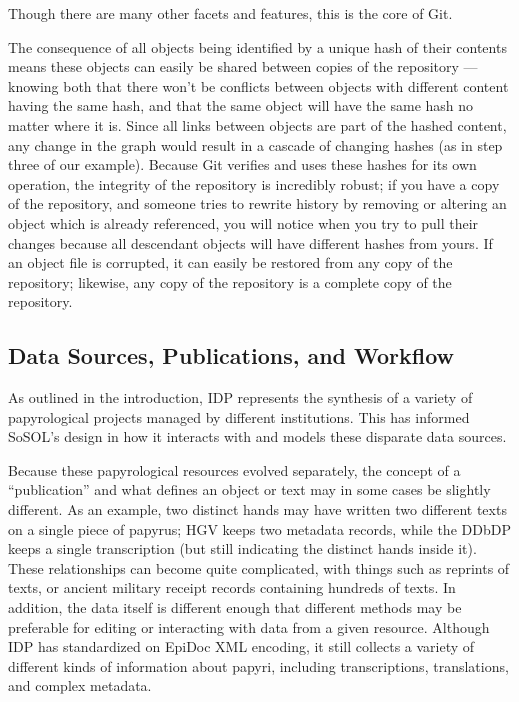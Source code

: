 \documentclass[]{article}
\begin{document}
Though there are many other facets and features, this is the core of Git.

The consequence of all objects being identified by a unique hash of their contents means these objects can easily be shared between copies of the repository — knowing both that there won't be conflicts between objects with different content having the same hash, and that the same object will have the same hash no matter where it is. Since all links between objects are part of the hashed content, any change in the graph would result in a cascade of changing hashes (as in step three of our example). Because Git verifies and uses these hashes for its own operation, the integrity of the repository is incredibly robust; if you have a copy of the repository, and someone tries to rewrite history by removing or altering an object which is already referenced, you will notice when you try to pull their changes because all descendant objects will have different hashes from yours. If an object file is corrupted, it can easily be restored from any copy of the repository; likewise, any copy of the repository is a complete copy of the repository.

\subsection*{Data Sources, Publications, and Workflow}

As outlined in the introduction, IDP represents the synthesis of a variety of papyrological projects managed by different institutions. This has informed SoSOL's design in how it interacts with and models these disparate data sources.

Because these papyrological resources evolved separately, the concept of a “publication” and what defines an object or text may in some cases be slightly different. As an example, two distinct hands may have written two different texts on a single piece of papyrus; HGV keeps two metadata records, while the DDbDP keeps a single transcription (but still indicating the distinct hands inside it). These relationships can become quite complicated, with things such as reprints of texts, or ancient military receipt records containing hundreds of texts. In addition, the data itself is different enough that different methods may be preferable for editing or interacting with data from a given resource. Although IDP has standardized on EpiDoc XML encoding, it still collects a variety of different kinds of information about papyri, including transcriptions, translations, and complex metadata.
\end{document}
